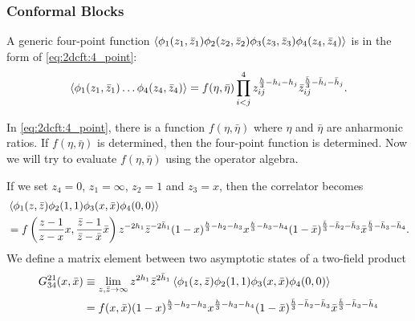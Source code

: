 \documentclass[10pt]{article}
\begin{document}
\subsubsection{Conformal Blocks\label{sec:conformal_blocks}}
A generic four-point function $\expval{\phi_1(z_1,\bar{z}_1)\phi_2(z_2,\bar{z}_2)\phi_3(z_3,\bar{z}_3)\phi_4(z_4,\bar{z}_4)}$ is in the form of \cref{eq:2dcft:4_point}:
\begin{align*}
    \expval{\phi_1(z_1,\bar{z}_1)\dots\phi_4(z_4,\bar{z}_4)}=f(\eta,\bar{\eta})\prod_{i<j}^4 z_{ij}^{\frac{h}{3}-h_i-h_j}\bar{z}_{ij}^{\frac{\bar{h}}{3}-\bar{h}_i-\bar{h}_j}.
\end{align*}
\begin{intu}
    In \cref{eq:2dcft:4_point}, there is a function $f(\eta,\bar{\eta})$ where $\eta$ and $\bar{\eta}$ are anharmonic ratios.
    If $f(\eta,\bar{\eta})$ is determined, then the four-point function is determined.
    Now we will try to evaluate $f(\eta,\bar{\eta})$ using the operator algebra. 
\end{intu}
If we set $z_4=0$, $z_1=\infty$, $z_2=1$ and $z_3=x$, then the correlator becomes 
\begin{align}
     & \expval{\phi_1(z,\bar{z})\phi_2(1,1)\phi_3(x,\bar{x})\phi_4(0,0)}\notag                                                                                                                                                                                     \\
     & =f\left(\frac{z-1}{z-x}x,\frac{\bar{z}-1}{\bar{z}-\bar{x}}\bar{x}\right)z^{-2h_1}\bar{z}^{-2\bar{h}_1}(1-x)^{\frac{h}{3}-h_2-h_3}x^{\frac{h}{3}-h_3-h_4}(1-\bar{x})^{\frac{\bar{h}}{3}-\bar{h}_2-\bar{h}_3}\bar{x}^{\frac{\bar{h}}{3}-\bar{h}_3-\bar{h}_4}.
\end{align}
We define a matrix element between two asymptotic states of a two-field product
\begin{align}
    G^{21}_{34}(x,\bar{x}) & \equiv\lim_{z,\bar{z}\to\infty}z^{2h_1} \bar{z}^{2\bar{h}_1}\expval{\phi_1(z,\bar{z})\phi_2(1,1)\phi_3(x,\bar{x})\phi_4(0,0)} \label{eq:operator:formalism:conformal_block:G_def}\\
                           & =f(x,\bar{x})(1-x)^{\frac{h}{3}-h_2-h_3}x^{\frac{h}{3}-h_3-h_4}(1-\bar{x})^{\frac{\bar{h}}{3}-\bar{h}_2-\bar{h}_3}\bar{x}^{\frac{\bar{h}}{3}-\bar{h}_3-\bar{h}_4}
\end{align}
\end{document}
